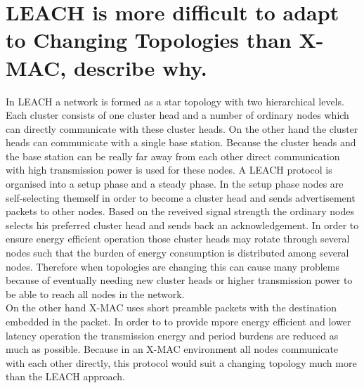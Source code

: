 \documentclass{report}
\begin{document}
	\section{LEACH is more difficult to adapt to Changing Topologies than X-MAC, describe why.}
	\startsection
		In LEACH a network is formed as a star topology with two hierarchical levels. Each cluster consists of one cluster head and a number of ordinary nodes which can directly communicate with these cluster heads. On the other hand the cluster heads can communicate with a single base station. Because the cluster heads and the base station can be really far away from each other direct communication with high transmission power is used for these nodes. A LEACH protocol is organised into a setup phase and a steady phase. In the setup phase nodes are self-selecting themself in order to become a cluster head and sends advertisement packets to other nodes. Based on the reveived signal strength the ordinary nodes selects his preferred cluster head and sends back an acknowledgement. In order to ensure energy efficient operation those cluster heads may rotate through several nodes such that the burden of energy consumption is distributed among several nodes. Therefore when topologies are changing this can cause many problems because of eventually needing new cluster heads or higher transmission power to be able to reach all nodes in the network. \\
		On the other hand X-MAC uses short preamble packets with the destination embedded in the packet. In order to to provide mpore energy efficient and lower latency operation the transmission energy and period burdens are reduced as much as possible. Because in an X-MAC environment all nodes communicate with each other directly, this protocol would suit a changing topology much more than the LEACH approach.
	\closesection
\end{document}
